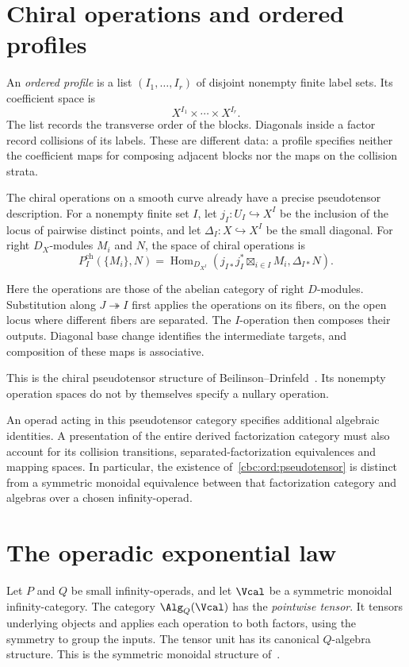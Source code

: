 \section{Chiral operations and ordered profiles}
An \emph{ordered profile} is a list $(I_1,\ldots,I_r)$ of disjoint nonempty finite label sets. Its coefficient space is
\[
 X^{I_1}\times\cdots\times X^{I_r}.
\]
The list records the transverse order of the blocks. Diagonals inside a factor record collisions of its labels. These are different data: a profile specifies neither the coefficient maps for composing adjacent blocks nor the maps on the collision strata.

The chiral operations on a smooth curve already have a precise pseudotensor description. For a nonempty finite set $I$, let $j_I:U_I\hookrightarrow X^I$ be the inclusion of the locus of pairwise distinct points, and let $\Delta_I:X\hookrightarrow X^I$ be the small diagonal. For right $D_X$-modules $M_i$ and $N$, the space of chiral operations is
\begin{equation}\label{cbc:ord:pseudotensor}
 P_I^{\mathrm{ch}}(\{M_i\},N)
 =\operatorname{Hom}_{D_{X^I}}
   \left(j_{I*}j_I^*\boxtimes_{i\in I}M_i,\Delta_{I*}N\right).
\end{equation}

Here the operations are those of the abelian category of right $D$-modules. Substitution along $J\twoheadrightarrow I$ first applies the operations on its fibers, on the open locus where different fibers are separated. The $I$-operation then composes their outputs. Diagonal base change identifies the intermediate targets, and composition of these maps is associative.

This is the chiral pseudotensor structure of Beilinson--Drinfeld~\cite[\S\S3.1.1--3.1.2]{BD04}. Its nonempty operation spaces do not by themselves specify a nullary operation.

An operad acting in this pseudotensor category specifies additional algebraic identities. A presentation of the entire derived factorization category must also account for its collision transitions, separated-factorization equivalences and mapping spaces. In particular, the existence of~\eqref{cbc:ord:pseudotensor} is distinct from a symmetric monoidal equivalence between that factorization category and algebras over a chosen infinity-operad.

\section{The operadic exponential law}
Let $P$ and $Q$ be small infinity-operads, and let $\Vcal$ be a symmetric monoidal infinity-category. The category $\Alg_Q(\Vcal)$ has the \emph{pointwise tensor}. It tensors underlying objects and applies each operation to both factors, using the symmetry to group the inputs. The tensor unit has its canonical $Q$-algebra structure. This is the symmetric monoidal structure of~\cite[Construction~3.2.4.1, Proposition~3.2.4.3 and Example~3.2.4.4]{LurieHA}.

